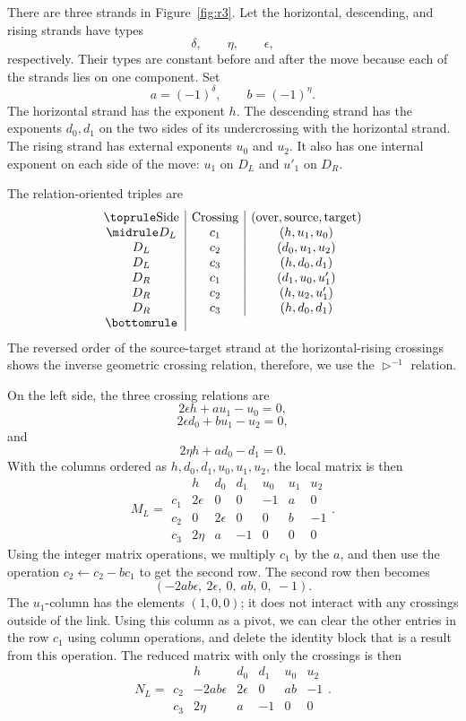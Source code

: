 \documentclass[11pt]{article}
\theoremstyle{definition}
\begin{document}
There are three strands in Figure~\ref{fig:r3}. Let the horizontal, descending, and rising strands have types
\[
\delta,\qquad\eta,\qquad\epsilon,
\]
respectively. Their types are constant before and after the move because each of the strands lies on one component. Set
\[
a=(-1)^\delta,
\qquad
b=(-1)^\eta.
\]
The horizontal strand has the exponent $h$. The descending strand has the exponents $d_0,d_1$ on the two sides of its undercrossing with the horizontal strand. The rising strand has external exponents $u_0$ and $u_2$. It also has one internal exponent on each side of the move: $u_1$ on $D_L$ and $u'_1$ on $D_R$.

The relation-oriented triples are
\[
\begin{array}{c|c|c}
\toprule
\text{Side}&\text{Crossing}&(\text{over},\text{source},\text{target})\\
\midrule
D_L&c_1&(h,u_1,u_0)\\
D_L&c_2&(d_0,u_1,u_2)\\
D_L&c_3&(h,d_0,d_1)\\
D_R&c_1&(d_1,u_0,u'_1)\\
D_R&c_2&(h,u_2,u'_1)\\
D_R&c_3&(h,d_0,d_1)\\
\bottomrule
\end{array}
\]
The reversed order of the source-target strand at the horizontal-rising crossings shows the inverse geometric crossing relation, therefore, we use the $\triangleright^{-1}$ relation.

On the left side, the three crossing relations are
\[
2\epsilon h+au_1-u_0=0,
\]
\[
2\epsilon d_0+bu_1-u_2=0,
\]
and
\[
2\eta h+ad_0-d_1=0.
\]
With the columns ordered as $h,d_0,d_1,u_0,u_1,u_2$, the local matrix is then
\[
M_L=
\begin{array}{c|cccccc}
&h&d_0&d_1&u_0&u_1&u_2\\ \hline
c_1&2\epsilon&0&0&-1&a&0\\
c_2&0&2\epsilon&0&0&b&-1\\
c_3&2\eta&a&-1&0&0&0
\end{array}.
\]
Using the integer matrix operations, we multiply $c_1$ by the $a$, and then use the operation $c_2\leftarrow c_2-bc_1$ to get the second row. The second row then becomes
\[
(-2ab\epsilon,\ 2\epsilon,\ 0,\ ab,\ 0,\ -1).
\]
The $u_1$-column has the elements $(1,0,0)$; it does not interact with any crossings outside of the link. Using this column as a pivot, we can clear the other entries in the row $c_1$ using column operations, and delete the identity block that is a result from this operation. The reduced matrix with only the crossings is then
\[
N_L=
\begin{array}{c|ccccc}
&h&d_0&d_1&u_0&u_2\\ \hline
c_2&-2ab\epsilon&2\epsilon&0&ab&-1\\
c_3&2\eta&a&-1&0&0
\end{array}.
\]
\end{document}
